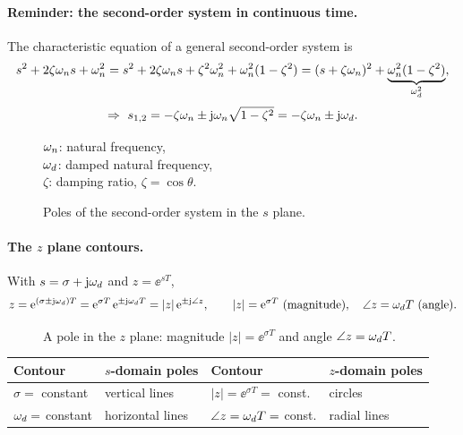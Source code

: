 \paragraph{Reminder: the second-order system in continuous time.} The characteristic equation of a general
second-order system is
\[
  s^{2}+2\zeta\omega_n s+\omega_n^{2}=s^{2}+2\zeta\omega_n s+\zeta^{2}\omega_n^{2}+\omega_n^{2}(1-\zeta^{2})
  =(s+\zeta\omega_n)^{2}+\underbrace{\omega_n^{2}(1-\zeta^{2})}_{\omega_d^{2}},
\]
\[
  \Rightarrow\ s_{1,2}=-\zeta\wn\pm\jj\wn\sqrt{1-\zeta^{2}}=-\zeta\wn\pm\jj\wdd.
\]
\begin{figure}[H]
\centering
\begin{minipage}{0.5\linewidth}\figSecondOrderS\end{minipage}\hfill
\begin{minipage}{0.45\linewidth}
$\omega_n$: natural frequency,\\ $\omega_d$: damped natural frequency,\\ $\zeta$: damping ratio, $\zeta=\cos\theta$.
\end{minipage}
\caption{Poles of the second-order system in the $s$ plane.}
\end{figure}

\paragraph{The $z$ plane contours.} With $s=\sigma+\mathrm{j}\omega_d$ and $z=\ee^{sT}$,
\begin{equation}
  z=\ee^{(\sigma\pm\jj\wdd)T}=\ee^{\sigma T}\,\ee^{\pm\jj\wdd T}=|z|\,\ee^{\pm\jj\angle z},\qquad
  |z|=\ee^{\sigma T}\ \text{(magnitude)},\quad \angle z=\wdd T\ \text{(angle)}.
\end{equation}
\begin{figure}[H]
\centering
\resizebox{0.35\linewidth}{!}{\figMapPoint}
\caption{A pole in the $z$ plane: magnitude $|z|=\ee^{\sigma T}$ and angle $\angle z=\omega_d T$.}
\end{figure}

\begin{center}
\renewcommand{\arraystretch}{1.5}
\begin{tabular}{@{}l l l l@{}}
Contour & $s$-domain poles & Contour & $z$-domain poles\\\hline
$\sigma=$ constant & vertical lines & $|z|=\ee^{\sigma T}=$ const. & circles\\
$\omega_d=$ constant & horizontal lines & $\angle z=\omega_d T=$ const. & radial lines
\end{tabular}
\end{center}

